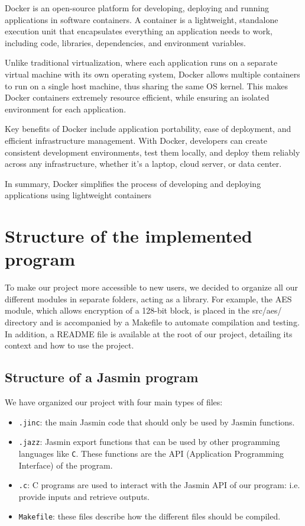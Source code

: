 \documentclass[runningheads]{llncs}
\begin{document}
Docker is an open-source platform for developing, deploying and running applications in software containers. A container is a lightweight, standalone execution unit that encapsulates everything an application needs to work, including code, libraries, dependencies, and environment variables. 

Unlike traditional virtualization, where each application runs on a separate virtual machine with its own operating system, Docker allows multiple containers to run on a single host machine, thus sharing the same OS kernel. This makes Docker containers extremely resource efficient, while ensuring an isolated environment for each application.

Key benefits of Docker include application portability, ease of deployment, and efficient infrastructure management. With Docker, developers can create consistent development environments, test them locally, and deploy them reliably across any infrastructure, whether it’s a laptop, cloud server, or data center.

In summary, Docker simplifies the process of developing and deploying applications using lightweight containers


\section{Structure of the implemented program}

To make our project more accessible to new users, we decided to organize all our different modules in separate folders, acting as a library. For example, the AES module, which allows encryption of a 128-bit block, is placed in the src/aes/ directory and is accompanied by a Makefile to automate compilation and testing. In addition, a README file is available at the root of our project, detailing its context and how to use the project.

\subsection{Structure of a Jasmin program}
We have organized our project with four main types of files:
\begin{itemize}
    \item \texttt{.jinc}: the main Jasmin code that should only be used by Jasmin functions.
    \item \texttt{.jazz}: Jasmin export functions that can be used by other programming languages like \texttt{C}. These functions are the API (Application Programming Interface) of the program.
    \item \texttt{.c}: C programs are used to interact with the Jasmin API of our program: i.e. provide inputs and retrieve outputs.
    \item \texttt{Makefile}: these files describe how the different files should be compiled.
\end{itemize}
\end{document}
